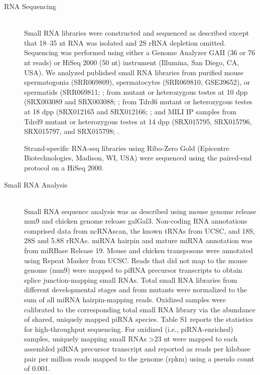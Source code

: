 \begin{description}
    \item[RNA Sequencing] \hfill \\
    Small RNA libraries were constructed and sequenced as described \citep{Ghildiyal2008, Seitz2008} except that 18–35 nt RNA was isolated and 2S rRNA depletion omitted. Sequencing was performed using either a Genome Analyzer GAII (36 or 76 nt reads) or HiSeq 2000 (50 nt) instrument (Illumina, San Diego, CA, USA). We analyzed published small RNA libraries from purified mouse spermatogonia (SRR069809), spermatocytes (SRR069810, GSE39652), or spermatids (SRR069811; \citep{Gan2011, Modzelewski2012}; from \mili{} mutant or heterozygous testes at 10 dpp (SRX003089 and SRX003088; \citep{Aravin2008a}; from Tdrd6 mutant or heterozygous testes at 18 dpp (SRX012165 and SRX012166; \citep{Vagin2009}; and MILI IP samples from Tdrd9 mutant or heterozygous testes at 14 dpp (SRX015795, SRX015796, SRX015797, and SRX015798; \citep{Shoji2009}.

    Strand-specific RNA-seq libraries \citep{Zhang2012} using Ribo-Zero Gold (Epicentre Biotechnologies, Madison, WI, USA) were sequenced using the paired-end protocol on a HiSeq 2000.
    
    \item[Small RNA Analysis] \hfill \\
    Small RNA sequence analysis was as described \citep{Li2009a} using mouse genome release mm9 and chicken genome release galGal3. Non-coding RNA annotations comprised data from ncRNAscan, the known tRNAs from UCSC, and 18S, 28S and 5.8S rRNAs. miRNA hairpin and mature miRNA annotation was from miRBase Release 19. Mouse and chicken transposons were annotated using Repeat Masker from UCSC. Reads that did not map to the mouse genome (mm9) were mapped to piRNA precursor transcripts to obtain splice junction-mapping small RNAs. Total small RNA libraries from different developmental stages and from mutants were normalized to the sum of all miRNA hairpin-mapping reads. Oxidized samples were calibrated to the corresponding total small RNA library via the abundance of shared, uniquely mapped piRNA species. Table S1 reports the statistics for high-throughput sequencing. For oxidized (i.e., piRNA-enriched) samples, uniquely mapping small RNAs >23 nt were mapped to each assembled piRNA precursor transcript and reported as reads per kilobase pair per million reads mapped to the genome (rpkm) using a pseudo count of 0.001.


\end{description}
